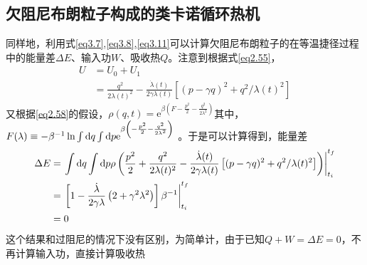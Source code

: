 \subsection{欠阻尼布朗粒子构成的类卡诺循环热机}
\qquad 同样地，利用式\eqref{eq3.7},\quad \eqref{eq3.8},\quad \eqref{eq3.11}可以计算欠阻尼布朗粒子的在等温捷径过程中的能量差$\Delta E$、输入功$W$、吸收热$Q$。注意到根据式\eqref{eq2.55}，
\begin{equation}
    \begin{split}
        U&=U_0 + U_1 \\
    &= \frac{q^2}{2 \lambda(t)^2}  - \frac{\dot{\lambda}(t)}{2 \gamma \lambda(t)}\left[(p-\gamma q)^{2}+ q^{2}/\lambda(t)^2\right]
    \end{split}  
    \label{eq3.42}
\end{equation}
又根据\eqref{eq2.58}的假设，$\rho(q, t)= \mathrm{e}^{{\beta\left(F - \frac{p^2}{2}-\frac{q^{2}}{2 \lambda^2}\right)}}$其中，$F(\lambda) \equiv-\beta^{-1} \ln  \int \mathrm{d} q \int \mathrm{d} p \mathrm{e}^{{\beta\left(-\frac{p^2}{2}-\frac{q^{2}}{2 \lambda^2}\right)}} $ 
。于是可以计算得到，能量差
\begin{equation}
    \begin{split}
        \Delta E&=\left.\int \mathrm{d} q \int \mathrm{d} p \rho \left( \frac{p^2}{2} + \frac{q^2}{2 \lambda(t)^2}  - \frac{\dot{\lambda}(t)}{2 \gamma \lambda(t)}\left[(p-\gamma q)^{2}+ q^{2}/\lambda(t)^2\right] \right)\right|_{t_{i}} ^{t_{f}}\\
        &=\left. \left[1-\frac{\dot{\lambda}}{2 \gamma \lambda}\left(2+\gamma^{2} \lambda^{2}\right)\right] \beta^{-1}\right|_{t_{i}} ^{t_{f}}\\
        &=0
    \end{split}
    \label{eq3.43}
\end{equation}
这个结果和过阻尼的情况下没有区别，为简单计，由于已知$Q + W = \Delta E =0$，不再计算输入功，直接计算吸收热
